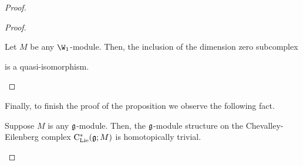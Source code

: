 \documentclass{article}
\begin{document}
\begin{proof}
\begin{proof}
\begin{lem} Let $M$ be any $\W_1$-module. 
Then, the inclusion of the dimension zero subcomplex
\ben
{}
\een
is a quasi-isomorphism.
\end{lem}

\end{proof}

Finally, to finish the proof of the proposition we observe the following fact.

\begin{lem}
Suppose $M$ is any $\mathfrak g$-module.
Then, the $\mathfrak g$-module structure on the Chevalley-Eilenberg complex ${\rm C}_{{\rm Lie}}^*(\mathfrak g ; M)$ is homotopically trivial.
\end{lem}

\end{proof}
\end{document}
